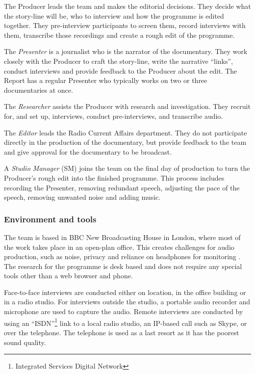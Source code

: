 The Producer leads the team and makes the editorial decisions. They decide what the story-line will be, who to interview
and how the programme is edited together. They pre-interview participants to screen them, record interviews with
them, transcribe those recordings and create a rough edit of the programme.

The \textit{Presenter} is a journalist who is the narrator of the documentary. They work closely with the Producer to
craft the story-line, write the narrative ``links'', conduct interviews and provide feedback to the Producer about the
edit. The Report has a regular Presenter who typically works on two or three documentaries at once.

The \textit{Researcher} assists the Producer with research and investigation. They recruit for, and set up, interviews,
conduct pre-interviews, and transcribe audio. 

The \textit{Editor} leads the Radio Current Affairs department. They do not participate directly in the production of
the documentary, but provide feedback to the team and give approval for the documentary to be broadcast.

A \textit{Studio Manager} (SM) joins the team on the final day of production to turn the Producer's rough edit into
the finished programme. This process includes recording the Presenter, removing redundant speech, adjusting the pace of
the speech, removing unwanted noise and adding music.

\subsubsection{Environment and tools}
The team is based in BBC New Broadcasting House in London, where most of the work takes place in an open-plan office.
This creates challenges for audio production, such as noise, privacy and reliance on headphones for monitoring
\citep{Brixen2003}.  The research for the programme is desk based and does not require any special tools other than a
web browser and phone.

Face-to-face interviews are conducted either on location, in the office building or in a radio studio.  For interviews
outside the studio, a portable audio recorder and microphone are used to capture the audio.  Remote interviews are
conducted by using an ``ISDN''\footnote{Integrated Services Digital Network} link to a local radio studio, an
IP-based call such as Skype, or over the telephone. The telephone is used as a last resort as it has the poorest sound
quality.

